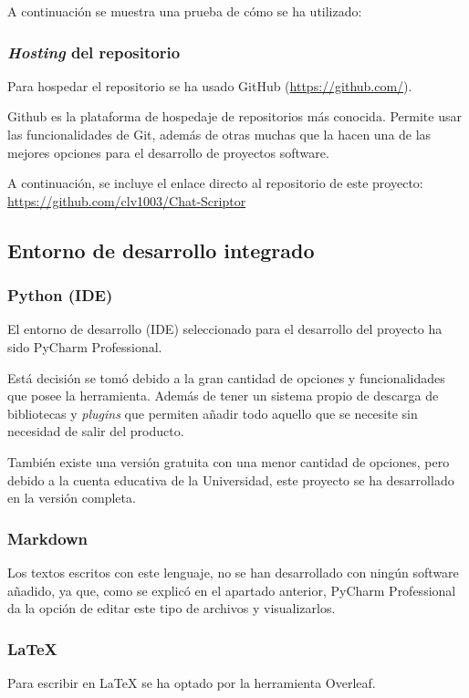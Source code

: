 A continuación se muestra una prueba de cómo se ha utilizado:

\subsubsection{\textit{Hosting} del repositorio}
Para hospedar el repositorio se ha usado GitHub (\url{https://github.com/}).

Github es la plataforma de hospedaje de repositorios más conocida. Permite usar las funcionalidades de Git, además de otras muchas que la hacen una de las mejores opciones para el desarrollo de proyectos software.

A continuación, se incluye el enlace directo al repositorio de este proyecto: \url{https://github.com/clv1003/Chat-Scriptor}

\subsection{Entorno de desarrollo integrado}
\subsubsection{Python (IDE)}
El entorno de desarrollo (IDE) seleccionado para el desarrollo del proyecto ha sido PyCharm Professional.

Está decisión se tomó debido a la gran cantidad de opciones y funcionalidades que posee la herramienta. Además de tener un sistema propio de descarga de bibliotecas y \textit{plugins} que permiten añadir todo aquello que se necesite sin necesidad de salir del producto.

También existe una versión gratuita con una menor cantidad de opciones, pero debido a la cuenta educativa de la Universidad, este proyecto se ha desarrollado en la versión completa.

\subsubsection{Markdown}
Los textos escritos con este lenguaje, no se han desarrollado con ningún software añadido, ya que, como se explicó en el apartado anterior, PyCharm Professional da la opción de editar este tipo de archivos y visualizarlos.


\subsubsection{\LaTeX}
Para escribir en \LaTeX{} se ha optado por la herramienta Overleaf.

